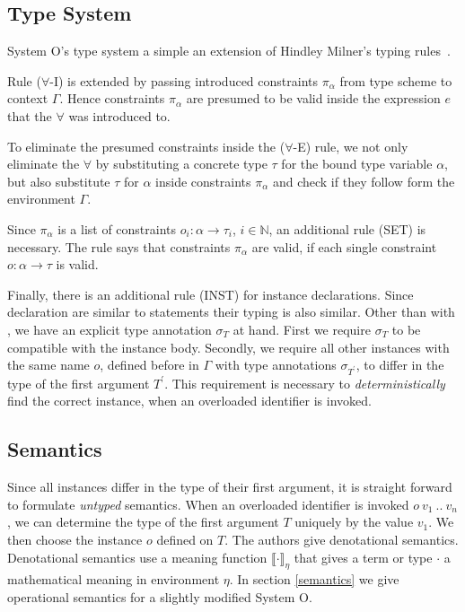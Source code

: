 \documentclass[runningheads]{llncs}
\newcommand{\snip}[1]{\footnotesize{\ttfamily{#1}}}
\begin{document}
\subsection{Type System}
System O's type system a simple an extension of Hindley Milner's typing rules~\cite{dm82}. 

Rule ($\forall$-I) is extended by passing introduced constraints $\pi_\alpha$ from type scheme to context $\Gamma$. 
Hence constraints $\pi_\alpha$ are presumed to be valid inside the expression $e$ that the $\forall$ was introduced to. 

To eliminate the presumed constraints inside the ($\forall$-E) rule, we not only eliminate the $\forall$ by substituting a concrete type $\tau$ for the bound type variable $\alpha$, but also substitute $\tau$ for $\alpha$ inside constraints $\pi_\alpha$ and check if they follow form the environment $\Gamma$. 

Since $\pi_\alpha$ is a list of constraints $o_i : \alpha \rightarrow \tau_i$, $i \in \mathbb{N}$, an additional rule (SET) is necessary. 
The rule says that constraints $\pi_\alpha$ are valid, if each single constraint $o: \alpha \rightarrow \tau$ is valid.

Finally, there is an additional rule (INST) for instance declarations. 
Since \snip{inst} declaration are similar to \snip{let} statements their typing is also similar. 
Other than with \snip{let}, we have an explicit type annotation $\sigma_T$ at hand. 
First we require $\sigma_T$ to be compatible with the instance body.
Secondly, we require all other instances with the same name $o$, defined before in $\Gamma$ with type annotations $\sigma_{T^\prime}$, to differ in the type of the first argument $T^\prime$. 
This requirement is necessary to \emph{deterministically} find the correct instance, when an overloaded identifier is invoked.

\subsection{Semantics}
Since all instances differ in the type of their first argument, it is straight forward to formulate \emph{untyped} semantics.
When an overloaded identifier is invoked $o \ v_1 \ .. \ v_n$, we can determine the type of the first argument $T$ uniquely by the value $v_1$.
We then choose the instance $o$ defined on $T$. 
The authors give denotational semantics.
Denotational semantics use a meaning function $\llbracket \cdot \rrbracket_\eta$ that gives a term or type $\cdot$ a mathematical meaning in environment $\eta$.
In section \ref{semantics} we give operational semantics for a slightly modified System O. 
\end{document}
